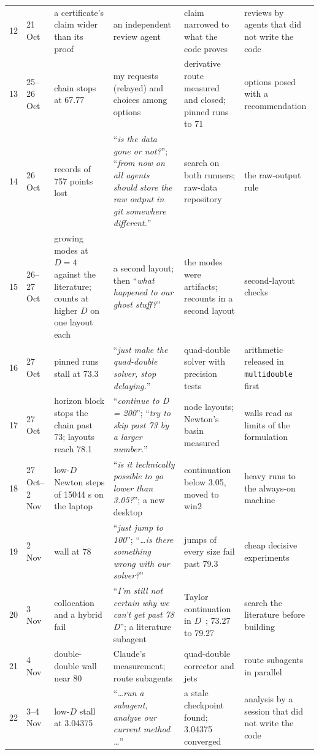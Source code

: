 \documentclass[aps,prd,onecolumn,superscriptaddress,nofootinbib,10pt]{revtex4-2}
\newcommand{\file}[1]{\texttt{#1}}
\newcommand{\prompt}[1]{``\textit{#1}''}
\begin{document}
\begin{center}
\begin{tabular}{rL{1.05cm}L{3.5cm}L{3.9cm}L{3.6cm}L{3.3cm}}
12 & 21 Oct & a certificate's claim wider than its proof & an independent review agent & claim narrowed to what the code proves & reviews by agents that did not write the code\\
13 & 25--26 Oct & chain stops at 67.77 & my requests (relayed) and choices among options & derivative route measured and closed; pinned runs to 71 & options posed with a recommendation\\
14 & 26 Oct & records of 757 points lost & \prompt{is the data gone or not?}; \prompt{from now on all agents should store the raw output in git somewhere different.} & search on both runners; raw-data repository & the raw-output rule\\
15 & 26--27 Oct & growing modes at $D = 4$ against the literature; counts at higher $D$ on one layout each & a second layout; then \prompt{what happened to our ghost stuff?} & the modes were artifacts; recounts in a second layout & second-layout checks\\
16 & 27 Oct & pinned runs stall at 73.3 & \prompt{just make the quad-double solver, stop delaying.} & quad-double solver with precision tests & arithmetic released in \file{multidouble} first\\
17 & 27 Oct & horizon block stops the chain past 73; layouts reach 78.1 & \prompt{continue to D = 200}; \prompt{try to skip past 73 by a larger number.} & node layouts; Newton's basin measured & walls read as limits of the formulation\\
18 & 27 Oct--2 Nov & low-$D$ Newton steps of 15044 s on the laptop & \prompt{is it technically possible to go lower than 3.05?}; a new desktop & continuation below 3.05, moved to win2 & heavy runs to the always-on machine\\
19 & 2 Nov & wall at 78 & \prompt{just jump to 100}; \prompt{\dots is there something wrong with our solver?} & jumps of every size fail past 79.3 & cheap decisive experiments\\
20 & 3 Nov & collocation and a hybrid fail & \prompt{I'm still not certain why we can't get past 78 D}; a literature subagent & Taylor continuation in $D$~\cite{Cochelin1994}; 73.27 to 79.27 & search the literature before building\\
21 & 4 Nov & double-double wall near 80 & Claude's measurement; route subagents & quad-double corrector and jets & route subagents in parallel\\
22 & 3--4 Nov & low-$D$ stall at 3.04375 & \prompt{\dots run a subagent, analyze our current method \dots} & a stale checkpoint found; 3.04375 converged & analysis by a session that did not write the code\\

\end{tabular}
\end{center}
\end{document}
